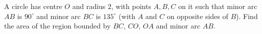 A circle has centre $O$ and radius $2$, with points $A,B,C$ on it such that minor arc $AB$ is $90^\circ$ and minor arc $BC$ is $135^\circ$ (with $A$ and $C$ on opposite sides of $B$). Find the area of the region bounded by $BC$, $CO$, $OA$ and minor arc $AB$.
